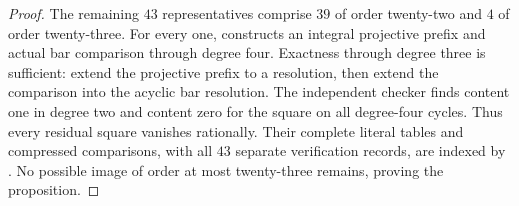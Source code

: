 \begin{proof}
The remaining $43$ representatives comprise $39$
of order twenty-two and $4$ of order twenty-three.
For every one,
constructs an integral projective prefix and actual
bar comparison through degree four. Exactness through
degree three is sufficient: extend the projective
prefix to a resolution, then extend the comparison
into the acyclic bar resolution. The independent
checker finds content one in degree two and content
zero for the square on all degree-four cycles.
Thus every residual square vanishes rationally.
Their complete literal tables and compressed
comparisons, with all $43$ separate verification
records, are indexed by
.
No possible image of order at most twenty-three
remains, proving the proposition.
\end{proof}

